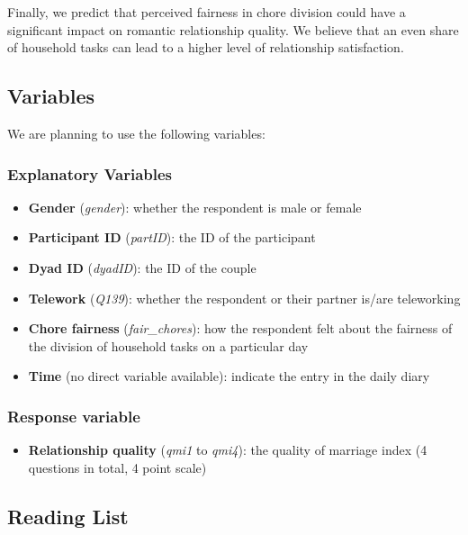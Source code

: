 \documentclass[
  english,
  man]{apa6}
\providecommand{\tightlist}{%
  \setlength{\itemsep}{0pt}\setlength{\parskip}{0pt}}
\begin{document}
Finally, we predict that perceived fairness in chore division could have a significant impact on romantic relationship quality. We believe that an even share of household tasks can lead to a higher level of relationship satisfaction.

\hypertarget{variables}{%
\subsection{Variables}\label{variables}}

We are planning to use the following variables:

\hypertarget{explanatory-variables}{%
\subsubsection{Explanatory Variables}\label{explanatory-variables}}

\begin{itemize}
\item
  \textbf{Gender} (\emph{gender}): whether the respondent is male or female
\item
  \textbf{Participant ID} (\emph{partID}): the ID of the participant
\item
  \textbf{Dyad ID} (\emph{dyadID}): the ID of the couple
\item
  \textbf{Telework} (\emph{Q139}): whether the respondent or their partner is/are teleworking
\item
  \textbf{Chore fairness} (\emph{fair\_chores}): how the respondent felt about the fairness of the division of household tasks on a particular day
\item
  \textbf{Time} (no direct variable available): indicate the entry in the daily diary
\end{itemize}

\hypertarget{response-variable}{%
\subsubsection{Response variable}\label{response-variable}}

\begin{itemize}
\tightlist
\item
  \textbf{Relationship quality} (\emph{qmi1} to \emph{qmi4}): the quality of marriage index (4 questions in total, 4 point scale)
\end{itemize}

\hypertarget{reading-list}{%
\subsection{Reading List}\label{reading-list}}
\end{document}
